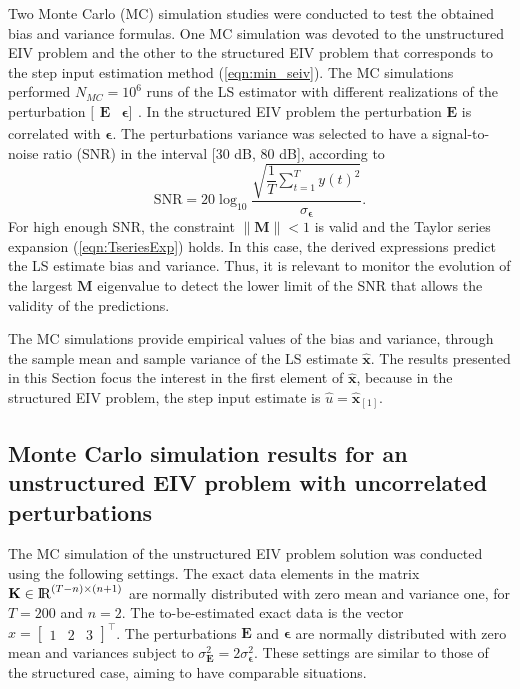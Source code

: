 Two Monte Carlo (MC) simulation studies were conducted to test the obtained bias and variance formulas.
One MC simulation was devoted to the unstructured EIV problem and the other to the structured EIV problem that corresponds to the step input estimation method (\ref{eqn:min_seiv}).
The MC simulations performed $N_{MC} = 10^6$ runs of the LS estimator with different realizations of the perturbation $[\begin{matrix} \mathbf{E} & \bm{\epsilon}] \end{matrix}$.
In the structured EIV problem the perturbation $\mathbf{E}$ is correlated with $\bm{\epsilon}$.
The perturbations variance was selected to have a signal-to-noise ratio (SNR) in the interval [30 dB, 80 dB], according to 
\begin{equation} \mathrm{SNR} = 20 \log_{10}{ \dfrac{ \sqrt{ \dfrac{1}{T} \sum\limits_{t=1}^{T}{ y(t)^2 } } }{ \sigma_{ \bm{\epsilon}}} } . \end{equation} 
For high enough SNR, the constraint $\| \mathbf{M} \| < 1$ is valid and the Taylor series expansion  (\ref{eqn:TseriesExp}) holds. 
In this case, the derived expressions predict the LS estimate bias and variance.
Thus, it is relevant to monitor the evolution of the largest $\mathbf{M}$ eigenvalue to detect the lower limit of the SNR  that allows the validity of the predictions.

The MC simulations provide empirical values of the bias and variance, through the sample mean and sample variance of the LS estimate $\widehat{\mathbf{x}}$.
The results presented in this Section focus the interest in the first element of $\widehat{\mathbf{x}}$, because in the structured EIV problem, the step input estimate is $\widehat{u} = \widehat{\mathbf{x}}_{\left[1\right]}$.

\subsection{Monte Carlo simulation results for an unstructured EIV problem with uncorrelated perturbations}

The MC simulation of the unstructured EIV problem solution was conducted using the following settings.
The exact data elements in the matrix $\mathbf{K} \in {\rm I\!R}^{\left(T-n\right) \times \left(n+1\right)}$  are normally distributed with zero mean and variance one, for $T = 200$ and $n = 2$.
The to-be-estimated exact data is the vector $x = \begin{bmatrix} 1 & 2 & 3 \end{bmatrix}^\top$.
The perturbations $\mathbf{E}$ and $\bm{\epsilon}$ are normally distributed with zero mean and variances subject to $\sigma_{\mathbf{E}}^2 = 2 \sigma_{\bm{\epsilon}}^2$.
These settings are similar to those of the structured case, aiming to have comparable situations.


